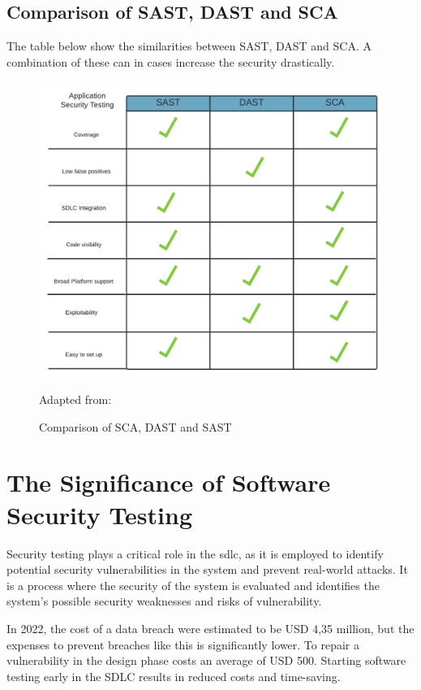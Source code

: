 \newpage
\subsection{Comparison of SAST, DAST and SCA}
The table below show the similarities between SAST, DAST and SCA. A combination of these can in cases increase the security drastically. 
\begin{figure}[htp]
    \centering
    \includegraphics[width=1\columnwidth]{Images/SCA vs DAST vs SAST.png}
    \caption{Comparison of SCA, DAST and SAST}Adapted from: \cite{Comparison}
    \label{fig:my_label}
\end{figure}



\newpage
\section{The Significance of Software Security Testing}
Security testing plays a critical role in the \acrlong{sdlc}, as it is employed to identify potential security vulnerabilities in the system and prevent real-world attacks. It is a process where the security of the system is evaluated and identifies the system's possible security weaknesses and risks of vulnerability.\cite{whysectest}

In 2022, the cost of a data breach were estimated to be USD 4,35 million\cite{databreach}, but the expenses to prevent breaches like this is significantly lower. To repair a vulnerability in the design phase costs an average of USD 500\cite{fixvulnerability}. Starting software testing early in the SDLC results in reduced costs and time-saving. 

